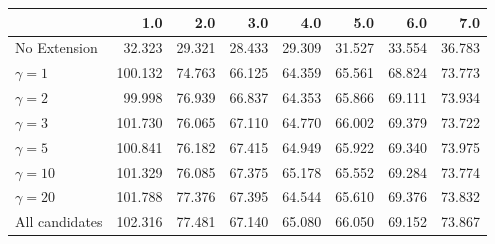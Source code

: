 \begin{tabular}{lrrrrrrr}
\toprule
{} &     1.0 &    2.0 &    3.0 &    4.0 &    5.0 &    6.0 &    7.0 \\
\midrule
No Extension   &  32.323 & 29.321 & 28.433 & 29.309 & 31.527 & 33.554 & 36.783 \\
$\gamma = 1$   & 100.132 & 74.763 & 66.125 & 64.359 & 65.561 & 68.824 & 73.773 \\
$\gamma = 2$   &  99.998 & 76.939 & 66.837 & 64.353 & 65.866 & 69.111 & 73.934 \\
$\gamma = 3$   & 101.730 & 76.065 & 67.110 & 64.770 & 66.002 & 69.379 & 73.722 \\
$\gamma = 5$   & 100.841 & 76.182 & 67.415 & 64.949 & 65.922 & 69.340 & 73.975 \\
$\gamma = 10$  & 101.329 & 76.085 & 67.375 & 65.178 & 65.552 & 69.284 & 73.774 \\
$\gamma = 20$  & 101.788 & 77.376 & 67.395 & 64.544 & 65.610 & 69.376 & 73.832 \\
All candidates & 102.316 & 77.481 & 67.140 & 65.080 & 66.050 & 69.152 & 73.867 \\
\bottomrule
\end{tabular}
